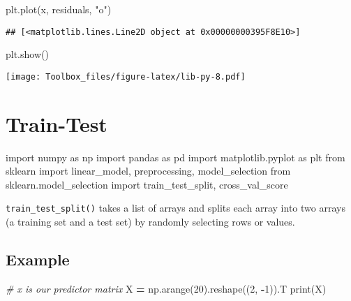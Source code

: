 \documentclass[
]{book}
\newenvironment{Shaded}{\begin{snugshade}}{\end{snugshade}}
\newcommand{\BuiltInTok}[1]{#1}
\newcommand{\CommentTok}[1]{\textcolor[rgb]{0.56,0.35,0.01}{\textit{#1}}}
\newcommand{\DecValTok}[1]{\textcolor[rgb]{0.00,0.00,0.81}{#1}}
\newcommand{\ImportTok}[1]{#1}
\newcommand{\NormalTok}[1]{#1}
\newcommand{\OperatorTok}[1]{\textcolor[rgb]{0.81,0.36,0.00}{\textbf{#1}}}
\newcommand{\StringTok}[1]{\textcolor[rgb]{0.31,0.60,0.02}{#1}}
\begin{document}
\begin{Shaded}
\begin{Highlighting}[]
\NormalTok{plt.plot(x, residuals, }\StringTok{"o"}\NormalTok{)}
\end{Highlighting}
\end{Shaded}

\begin{verbatim}
## [<matplotlib.lines.Line2D object at 0x00000000395F8E10>]
\end{verbatim}

\begin{Shaded}
\begin{Highlighting}[]
\NormalTok{plt.show()}
\end{Highlighting}
\end{Shaded}

\texttt{[image: Toolbox\_files/figure-latex/lib-py-8.pdf]}

\hypertarget{train-test}{%
\section{Train-Test}\label{train-test}}

\begin{Shaded}
\begin{Highlighting}[]
\ImportTok{import}\NormalTok{ numpy }\ImportTok{as}\NormalTok{ np}
\ImportTok{import}\NormalTok{ pandas }\ImportTok{as}\NormalTok{ pd}
\ImportTok{import}\NormalTok{ matplotlib.pyplot }\ImportTok{as}\NormalTok{ plt}
\ImportTok{from}\NormalTok{ sklearn }\ImportTok{import}\NormalTok{ linear\_model, preprocessing, model\_selection}
\ImportTok{from}\NormalTok{ sklearn.model\_selection }\ImportTok{import}\NormalTok{ train\_test\_split, cross\_val\_score}
\end{Highlighting}
\end{Shaded}

\texttt{train\_test\_split()} takes a list of arrays and splits each array into two arrays (a training set and a test set) by randomly selecting rows or values.

\hypertarget{example}{%
\subsection{Example}\label{example}}

\begin{Shaded}
\begin{Highlighting}[]
\CommentTok{\# x is our predictor matrix}
\NormalTok{X }\OperatorTok{=}\NormalTok{ np.arange(}\DecValTok{20}\NormalTok{).reshape((}\DecValTok{2}\NormalTok{, }\OperatorTok{{-}}\DecValTok{1}\NormalTok{)).T}
\BuiltInTok{print}\NormalTok{(X)}
\end{Highlighting}
\end{Shaded}
\end{document}
